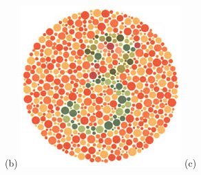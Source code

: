 \documentclass[	12pt, Times, openright, twoside, a4paper, english, brazil]{abntex2}
\begin{document}
\begin{apendicesenv}
\begin{figure}[!htb]
(b)
\endminipage\hfill
{}
\centering
{\includegraphics[width=\linewidth]{ishihara-transformacao/plate7.png}}
(c)
\endminipage\hfill


\end{figure}
\end{apendicesenv}
\end{document}
